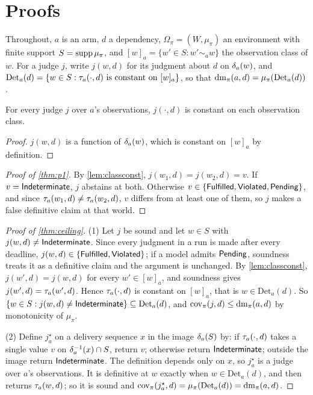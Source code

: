 \section{Proofs}
\label{app:proofs}

Throughout, $a$ is an arm, $d$ a dependency, $\Omega_\pi = (W, \mu_\pi)$ an environment with finite support $S = \operatorname{supp}\mu_\pi$, and $[w]_a = \{ w' \in S : w' \sim_a w \}$ the observation class of $w$. For a judge $j$, write $j(w,d)$ for its judgment about $d$ on $\delta_a(w)$, and $\mathrm{Det}_a(d) = \{ w \in S : \tau_a(\cdot, d) \text{ is constant on } [w]_a \}$, so that $\operatorname{dm}_\pi(a,d) = \mu_\pi(\mathrm{Det}_a(d))$.

\begin{lemma}
\label{lem:classconst}
For every judge $j$ over $a$'s observations, $j(\cdot, d)$ is constant on each observation class.
\end{lemma}

\begin{proof}
$j(w, d)$ is a function of $\delta_a(w)$, which is constant on $[w]_a$ by definition.
\end{proof}

\begin{proof}[Proof of \cref{thm:p1}]
By \cref{lem:classconst}, $j(w_1, d) = j(w_2, d) = v$. If $v = \mathsf{Indeterminate}$, $j$ abstains at both. Otherwise $v \in \{\mathsf{Fulfilled}, \mathsf{Violated}, \mathsf{Pending}\}$, and since $\tau_a(w_1, d) \neq \tau_a(w_2, d)$, $v$ differs from at least one of them, so $j$ makes a false definitive claim at that world.
\end{proof}

\begin{proof}[Proof of \cref{thm:ceiling}]
(1) Let $j$ be sound and let $w \in S$ with $j(w, d) \neq \mathsf{Indeterminate}$. Since every judgment in a run is made after every deadline, $j(w,d) \in \{\mathsf{Fulfilled},\mathsf{Violated}\}$; if a model admits $\mathsf{Pending}$, soundness treats it as a definitive claim and the argument is unchanged. By \cref{lem:classconst}, $j(w', d) = j(w, d)$ for every $w' \in [w]_a$, and soundness gives $j(w', d) = \tau_a(w', d)$. Hence $\tau_a(\cdot, d)$ is constant on $[w]_a$, that is $w \in \mathrm{Det}_a(d)$. So $\{ w \in S : j(w,d) \neq \mathsf{Indeterminate} \} \subseteq \mathrm{Det}_a(d)$, and $\operatorname{cov}_\pi(j, d) \leq \operatorname{dm}_\pi(a,d)$ by monotonicity of $\mu_\pi$.

(2) Define $j^\star_a$ on a delivery sequence $x$ in the image $\delta_a(S)$ by: if $\tau_a(\cdot, d)$ takes a single value $v$ on $\delta_a^{-1}(x) \cap S$, return $v$; otherwise return $\mathsf{Indeterminate}$; outside the image return $\mathsf{Indeterminate}$. The definition depends only on $x$, so $j^\star_a$ is a judge over $a$'s observations. It is definitive at $w$ exactly when $w \in \mathrm{Det}_a(d)$, and then returns $\tau_a(w,d)$; so it is sound and $\operatorname{cov}_\pi(j^\star_a, d) = \mu_\pi(\mathrm{Det}_a(d)) = \operatorname{dm}_\pi(a, d)$.
\end{proof}

